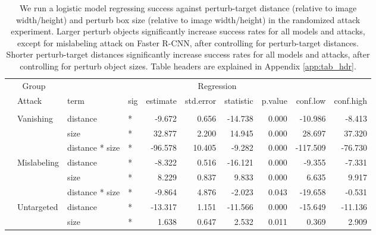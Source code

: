 \documentclass[
]{article}
\begin{document}
\begin{longtable}[t]{llllrrrrrr}
\caption{\label{tab:perturb_bbox_and_object_dist_table}We run a logistic model regressing success against perturb-target distance (relative to image width/height) and perturb box size (relative to image width/height) in the randomized attack experiment. Larger perturb objects significantly increase success rates for all models and attacks, except for mislabeling attack on Faster R-CNN, after controlling for perturb-target distances. Shorter perturb-target distances significantly increase success rates for all models and attacks, after controlling for perturb object sizes. Table headers are explained in Appendix \ref{app:tab_hdr}.}\\
\toprule
\multicolumn{2}{c}{Group} & \multicolumn{8}{c}{Regression} \\
\cmidrule(l{3pt}r{3pt}){1-2} \cmidrule(l{3pt}r{3pt}){3-10}
 & Attack & term & sig & estimate & std.error & statistic & p.value & conf.low & conf.high\\
\midrule
\addlinespace[0.3em]
\multicolumn{10}{l}{\textbf{YOLOv3}}\\
\hspace{1em} & Vanishing & distance & * & -9.672 & 0.656 & -14.738 & 0.000 & -10.986 & -8.413\\
\cmidrule{3-10}\nopagebreak
\hspace{1em} &  & size & * & 32.877 & 2.200 & 14.945 & 0.000 & 28.697 & 37.320\\
\cmidrule{3-10}\nopagebreak
\hspace{1em} &  & distance * size & * & -96.578 & 10.405 & -9.282 & 0.000 & -117.509 & -76.730\\
\cmidrule{2-10}\nopagebreak
\hspace{1em} & Mislabeling & distance & * & -8.322 & 0.516 & -16.121 & 0.000 & -9.355 & -7.331\\
\cmidrule{3-10}\nopagebreak
\hspace{1em} &  & size & * & 8.229 & 0.837 & 9.833 & 0.000 & 6.635 & 9.917\\
\cmidrule{3-10}\nopagebreak
\hspace{1em} &  & distance * size & * & -9.864 & 4.876 & -2.023 & 0.043 & -19.658 & -0.531\\
\cmidrule{2-10}\nopagebreak
\hspace{1em} & Untargeted & distance & * & -13.317 & 1.151 & -11.566 & 0.000 & -15.649 & -11.136\\
\cmidrule{3-10}\nopagebreak
\hspace{1em} &  & size & * & 1.638 & 0.647 & 2.532 & 0.011 & 0.369 & 2.909\\

\end{longtable}
\end{document}
